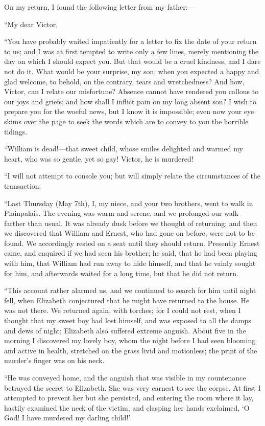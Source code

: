 \documentclass[12pt,openright]{book}
\begin{document}
On my return, I found the following letter from my father:—

“My dear Victor,

“You have probably waited impatiently for a letter to fix the date of your return to us; and I was at first tempted to write only a few lines, merely mentioning the day on which I should expect you. But that would be a cruel kindness, and I dare not do it. What would be your surprise, my son, when you expected a happy and glad welcome, to behold, on the contrary, tears and wretchedness? And how, Victor, can I relate our misfortune? Absence cannot have rendered you callous to our joys and griefs; and how shall I inflict pain on my long absent son? I wish to prepare you for the woeful news, but I know it is impossible; even now your eye skims over the page to seek the words which are to convey to you the horrible tidings.

“William is dead!—that sweet child, whose smiles delighted and warmed my heart, who was so gentle, yet so gay! Victor, he is murdered!

“I will not attempt to console you; but will simply relate the circumstances of the transaction.

“Last Thursday (May 7th), I, my niece, and your two brothers, went to walk in Plainpalais. The evening was warm and serene, and we prolonged our walk farther than usual. It was already dusk before we thought of returning; and then we discovered that William and Ernest, who had gone on before, were not to be found. We accordingly rested on a seat until they should return. Presently Ernest came, and enquired if we had seen his brother; he said, that he had been playing with him, that William had run away to hide himself, and that he vainly sought for him, and afterwards waited for a long time, but that he did not return.

“This account rather alarmed us, and we continued to search for him until night fell, when Elizabeth conjectured that he might have returned to the house. He was not there. We returned again, with torches; for I could not rest, when I thought that my sweet boy had lost himself, and was exposed to all the damps and dews of night; Elizabeth also suffered extreme anguish. About five in the morning I discovered my lovely boy, whom the night before I had seen blooming and active in health, stretched on the grass livid and motionless; the print of the murder’s finger was on his neck.

“He was conveyed home, and the anguish that was visible in my countenance betrayed the secret to Elizabeth. She was very earnest to see the corpse. At first I attempted to prevent her but she persisted, and entering the room where it lay, hastily examined the neck of the victim, and clasping her hands exclaimed, ‘O God! I have murdered my darling child!’
\end{document}
